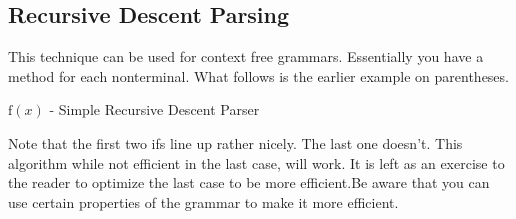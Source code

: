 \subsection{Recursive Descent Parsing}

This technique can be used for  context free grammars. Essentially
you have a method for each nonterminal. What follows is the earlier
example on parentheses.

\begin{algorithm}
\caption{$\mathrm{f}(x)$ - Simple Recursive Descent Parser}
\label{parsing:RDP}
\begin{algorithmic}
\ENDIF
{}
\ENDIF
\ENDIF
{}
\ENDIF
\ENDFOR
{}
\end{algorithmic}
\end{algorithm}

Note that the first two ifs line up rather nicely. The last one
doesn't. This algorithm while not efficient in the last case, will
work. It is left as an exercise to the reader to optimize the last
case to be more efficient.Be aware that you can use certain properties
of the grammar to make it more efficient.